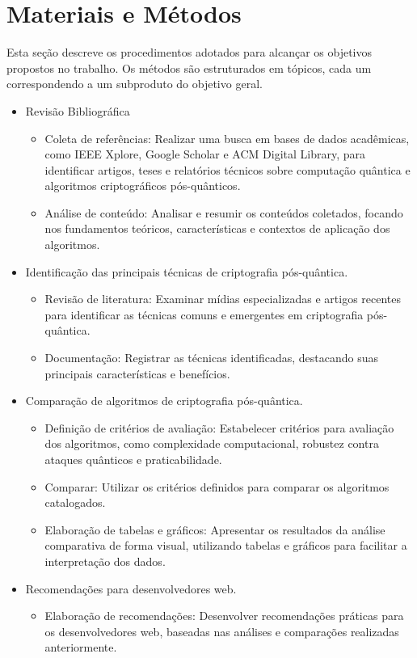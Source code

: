 
\chapter{Materiais e Métodos}\label{cap:materialemetodos}

Esta seção descreve os procedimentos adotados para alcançar os objetivos propostos no trabalho. Os métodos são estruturados em tópicos, cada um correspondendo a um subproduto do objetivo geral.

\begin{itemize}
	\item Revisão Bibliográfica
	\begin{itemize}
		\item  Coleta de referências: Realizar uma busca em bases de dados acadêmicas, como IEEE Xplore, Google Scholar e ACM Digital Library, para identificar artigos, teses e relatórios técnicos sobre computação quântica e algoritmos criptográficos pós-quânticos.
		\item Análise de conteúdo: Analisar e resumir os conteúdos coletados, focando nos fundamentos teóricos, características e contextos de aplicação dos algoritmos.        
	\end{itemize}
	\item  Identificação das principais técnicas de criptografia pós-quântica.
	\begin{itemize}
		\item Revisão de literatura: Examinar mídias especializadas e artigos recentes para identificar as técnicas comuns e emergentes em criptografia pós-quântica.
		\item Documentação: Registrar as técnicas identificadas, destacando suas principais características e benefícios.
	\end{itemize}
	\item Comparação de algoritmos de criptografia pós-quântica.
	\begin{itemize}
		\item Definição de critérios de avaliação: Estabelecer critérios para avaliação dos algoritmos, como complexidade computacional, robustez contra ataques quânticos e praticabilidade.
		\item Comparar: Utilizar os critérios definidos para comparar os algoritmos catalogados.
		\item Elaboração de tabelas e gráficos: Apresentar os resultados da análise comparativa de forma visual, utilizando tabelas e gráficos para facilitar a interpretação dos dados.        
	\end{itemize}
	\item Recomendações para desenvolvedores web.
	\begin{itemize}
		\item Elaboração de recomendações: Desenvolver recomendações práticas para os desenvolvedores web, baseadas nas análises e comparações realizadas anteriormente.
	\end{itemize}
\end{itemize}


